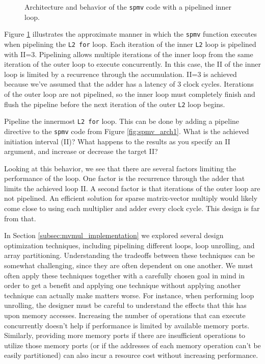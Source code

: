 \begin{figure}
\centering

\caption{Architecture and behavior of the \lstinline{spmv} code with a pipelined inner loop.}
\label{fig:spmv_pipeline_inner}
\end{figure}

Figure \ref{fig:spmv_pipeline_inner} illustrates the approximate manner in which the \lstinline{spmv} function executes when pipelining the \lstinline{L2 for} loop. Each iteration of the inner \lstinline{L2} loop is pipelined with II=3.  Pipelining allows multiple iterations of the inner loop from the same iteration of the outer loop to execute concurrently.  In this case, the II of the inner loop is limited by a recurrence through the accumulation.  II=3 is achieved because we've assumed that the adder has a latency of 3 clock cycles.  Iterations of the outer loop are not pipelined, so the inner loop must completely finish and flush the pipeline before the next iteration of the outer \lstinline{L2} loop begins.

\begin{exercise}
Pipeline the innermost \lstinline{L2 for} loop. This can be done by adding a pipeline directive to the \lstinline{spmv} code from Figure \ref{fig:spmv_arch1}. What is the achieved initiation interval (II)? What happens to the results as you specify an II argument, and increase or decrease the target II? 
\end{exercise}

Looking at this behavior, we see that there are several factors limiting the performance of the loop.  One factor is the recurrence through the adder that limits the achieved loop II.  A second factor is that iterations of the outer loop are not pipelined.  An efficient solution for sparse matrix-vector multiply would likely come close to using each multiplier and adder every clock cycle.  This design is far from that.

In Section \ref{subsec:mvmul_implementation} we explored several design optimization techniques, including pipelining different loops, loop unrolling, and array partitioning.  Understanding the tradeoffs between these techniques can be somewhat challenging, since they are often dependent on one another.  We must often apply these techniques together with a carefully chosen goal in mind in order to get a benefit and applying one technique without applying another technique can actually make matters worse.  For instance, when performing loop unrolling, the designer must be careful to understand the effects that this has upon memory accesses. Increasing the number of operations that can execute concurrently doesn't help if performance is limited by available memory ports.  Similarly, providing more memory ports if there are insufficient operations to utilize those memory ports (or if the addresses of each memory operation can't be easily partitioned) can also incur a resource cost without increasing performance.   

